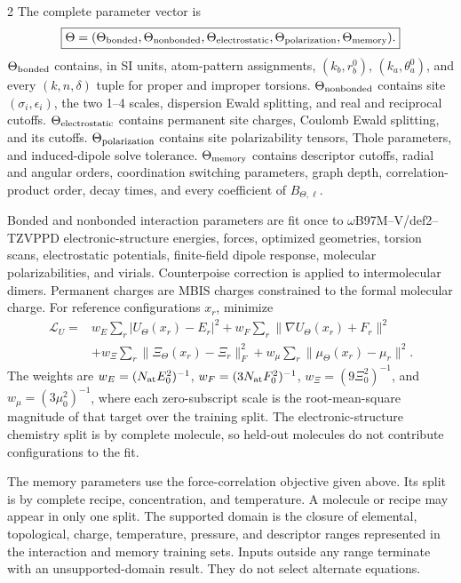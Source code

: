 \documentclass[10pt]{article}
\begin{document}
\begin{multicols}{2}
The complete parameter vector is
\[
\boxed{
\Theta=(\Theta_{\rm bonded},\Theta_{\rm nonbonded},
\Theta_{\rm electrostatic},\Theta_{\rm polarization},
\Theta_{\rm memory}).}
\]
\(\Theta_{\rm bonded}\) contains, in SI units, atom-pattern assignments,
\((k_b,r_b^0)\), \((k_a,\theta_a^0)\), and every
\((k,n,\delta)\) tuple for proper and improper torsions.
\(\Theta_{\rm nonbonded}\) contains site \((\sigma_i,\epsilon_i)\), the two 1--4
scales, dispersion Ewald splitting, and real and reciprocal cutoffs.
\(\Theta_{\rm electrostatic}\) contains permanent site charges, Coulomb Ewald
splitting, and its cutoffs.  \(\Theta_{\rm polarization}\) contains site
polarizability tensors, Thole parameters, and induced-dipole solve tolerance.
\(\Theta_{\rm memory}\) contains descriptor cutoffs, radial and angular orders,
coordination switching parameters, graph depth, correlation-product order,
decay times, and every coefficient of \(B_{\Theta,\ell}\).

Bonded and nonbonded interaction parameters are fit once to
\(\omega\)B97M--V/def2--TZVPPD electronic-structure energies, forces, optimized
geometries, torsion scans, electrostatic potentials, finite-field dipole response,
molecular polarizabilities, and virials.  Counterpoise correction is applied to
intermolecular dimers.  Permanent charges are MBIS charges constrained to the
formal molecular charge.  For reference configurations \(x_r\), minimize
\[
\begin{aligned}
\mathcal L_U={}&
w_E\sum_r|U_\Theta(x_r)-E_r|^2
+w_F\sum_r\|\nabla U_\Theta(x_r)+F_r\|^2\\
&+w_\Xi\sum_r\|\Xi_\Theta(x_r)-\Xi_r\|_F^2
+w_\mu\sum_r\|\mu_\Theta(x_r)-\mu_r\|^2 .
\end{aligned}
\]
The weights are \(w_E=(N_{\rm at}E_0^2)^{-1}\),
\(w_F=(3N_{\rm at}F_0^2)^{-1}\),
\(w_\Xi=(9\Xi_0^2)^{-1}\), and \(w_\mu=(3\mu_0^2)^{-1}\), where each zero-subscript
scale is the root-mean-square magnitude of that target over the training split.
The electronic-structure chemistry split is by complete molecule, so
held-out molecules do not contribute configurations to the fit.

The memory parameters use the force-correlation objective given above.  Its split
is by complete recipe, concentration, and temperature.  A molecule or recipe may
appear in only one split.  The supported domain is the closure of elemental,
topological, charge, temperature, pressure, and descriptor ranges represented in
the interaction and memory training sets.  Inputs outside any range terminate with
an unsupported-domain result.  They do not select alternate equations.


\end{multicols}
\end{document}
